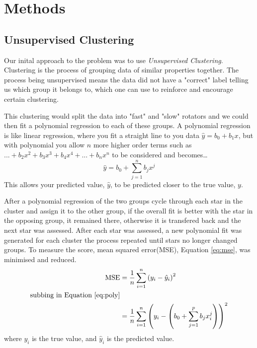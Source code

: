 \documentclass[fleqn,usenatbib]{mnras}
\begin{document}
\section{Methods}
\subsection{Unsupervised Clustering}
Our inital approach to the problem was to use \textit{Unsupervised Clustering}.
Clustering is the process of grouping data of similar properties together.
The process being unsupervised means the data did not have a "correct" label telling us which group it belongs to, which one can use to reinforce and encourage certain clustering.

This clustering would split the data into "fast" and "slow" rotators and we could then fit a polynomial regression to each of these groups.
A polynomial regression is like linear regression, where you fit a straight line to you data $\hat{y} = b_0 + b_1x$, but with polynomial you allow $n$ more higher order terms such as $...+ b_2x^2 + b_3x^3+b_4x^4+...+b_nx^n $ to be considered and becomes\dots
\begin{equation}
	\label{eq:poly}
	\hat{y} = b_0 + \sum_{j = 1}^n b_jx^j
\end{equation}
This allows your predicted value, $\hat{y}$, to be predicted closer to the true value, $y$.

After a polynomial regression of the two groups cycle through each star in the cluster and assign it to the other group, if the overall fit is better with the star in the opposing group, it remained there, otherwise it is transfered back and the next star was assessed.
After each star was assessed, a new polynomial fit was generated for each cluster the process repeated until stars no longer changed groups.
To measure the score, mean squared error(MSE), Equation \ref{eq:mse}, was minimised and reduced.
\begin{align}
	\label{eq:mse}
	\textup{MSE} &= \frac{1}{n}\sum_{i=1}^n \left(y_i - \hat{y}_i\right)^2 \\
	\textup{subbing in Equation \ref{eq:poly}} \nonumber \\
	&= \frac{1}{n}\sum_{i = 1}^n \left(y_i - \left(b_0 + \sum_{j = 1}^p b_jx_i^j\right) \right)^2
\end{align}
where $y_i$ is the true value, and $\hat{y}_i$ is the predicted value.
	
\end{document}
